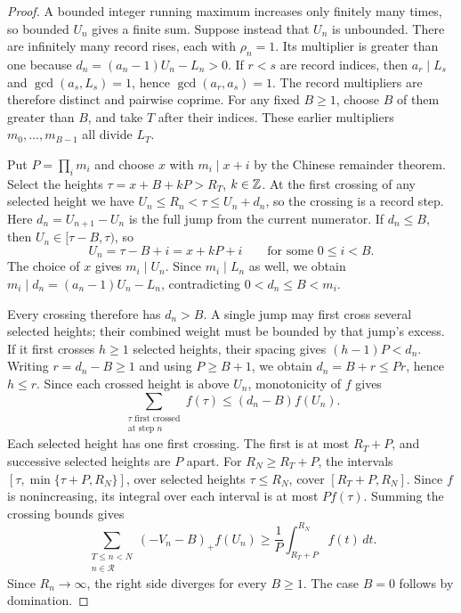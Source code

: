 \documentclass[11pt]{article}
\begin{document}
\begin{proof}
A bounded integer running maximum increases only finitely many times, so
bounded $U_n$ gives a finite sum. Suppose instead that $U_n$ is unbounded.
There are infinitely many record rises, each with $\rho_n=1$. Its multiplier is
greater than one because $d_n=(a_n-1)U_n-L_n>0$. If $r<s$ are record
indices, then $a_r\mid L_s$ and $\gcd(a_s,L_s)=1$, hence
$\gcd(a_r,a_s)=1$. The record multipliers are therefore distinct and pairwise
coprime. For any fixed $B\ge1$, choose $B$ of them greater than $B$,
and take $T$ after their indices. These earlier multipliers
$m_0,\ldots,m_{B-1}$ all divide $L_T$.

Put $P=\prod_i m_i$ and choose $x$ with $m_i\mid x+i$ by the
Chinese remainder theorem. Select the heights $\tau=x+B+kP>R_T$,
$k\in\mathbb{Z}$. At the first crossing of any selected height we have
$U_n\le R_n<\tau\le U_n+d_n$, so the crossing is a record step.
Here $d_n=U_{n+1}-U_n$ is the full jump from the current numerator.
If $d_n\le B$, then $U_n\in[\tau-B,\tau)$, so
\[
 U_n=\tau-B+i=x+kP+i\qquad\text{for some }0\le i<B.
\]
The choice of $x$ gives $m_i\mid U_n$. Since $m_i\mid L_n$ as well,
we obtain $m_i\mid d_n=(a_n-1)U_n-L_n$, contradicting
$0<d_n\le B<m_i$.

Every crossing therefore has $d_n>B$. A single jump may first cross
several selected heights; their combined weight must be bounded by
that jump's excess. If it first crosses $h\ge1$ selected heights,
their spacing gives $(h-1)P<d_n$.
Writing $r=d_n-B\ge1$ and using $P\ge B+1$, we obtain
$d_n=B+r\le Pr$, hence $h\le r$. Since each crossed height is above
$U_n$, monotonicity of $f$ gives
\[
 \sum_{\substack{\tau\text{ first crossed}\\\text{at step }n}}f(\tau)
 \le(d_n-B)f(U_n).
\]
Each selected height has one first crossing. The first is at most
$R_T+P$, and successive selected heights are $P$ apart. For
$R_N\ge R_T+P$, the intervals
$[\tau,\min\{\tau+P,R_N\}]$, over selected heights $\tau\le R_N$,
cover $[R_T+P,R_N]$. Since $f$ is nonincreasing, its integral over
each interval is at most $P f(\tau)$. Summing the crossing bounds gives
\begin{equation}\label{long243:eq:weightedcrossing}
 \sum_{\substack{T\le n<N\\n\in\mathcal R}}(-V_n-B)_+f(U_n)
 \ge\frac1P\int_{R_T+P}^{R_N} f(t)\,dt.
\end{equation}
Since $R_n\to\infty$, the right side diverges for every $B\ge1$.
The case $B=0$ follows by domination.
\end{proof}
\end{document}
